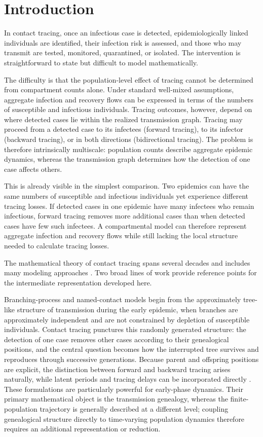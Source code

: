 \documentclass[review,12pt]{elsarticle}
\numberwithin{equation}{section}
\theoremstyle{remark}
\begin{document}
\section{Introduction}\label{sec1}

In contact tracing, once an infectious case is detected, epidemiologically linked individuals are identified, their infection risk is assessed, and those who may transmit are tested, monitored, quarantined, or isolated. The intervention is straightforward to state but difficult to model mathematically.

The difficulty is that the population-level effect of tracing cannot be determined from compartment counts alone. Under standard well-mixed assumptions, aggregate infection and recovery flows can be expressed in terms of the numbers of susceptible and infectious individuals. Tracing outcomes, however, depend on where detected cases lie within the realized transmission graph. Tracing may proceed from a detected case to its infectees (forward tracing), to its infector (backward tracing), or in both directions (bidirectional tracing). The problem is therefore intrinsically multiscale: population counts describe aggregate epidemic dynamics, whereas the transmission graph determines how the detection of one case affects others.

This is already visible in the simplest comparison. Two epidemics can have the same numbers of susceptible and infectious individuals yet experience different tracing losses. If detected cases in one epidemic have many infectees who remain infectious, forward tracing removes more additional cases than when detected cases have few such infectees. A compartmental model can therefore represent aggregate infection and recovery flows while still lacking the local structure needed to calculate tracing losses.

The mathematical theory of contact tracing spans several decades and includes many modeling approaches \cite{muller2021}. Two broad lines of work provide reference points for the intermediate representation developed here.

Branching-process and named-contact models begin from the approximately tree-like structure of transmission during the early epidemic, when branches are approximately independent and are not constrained by depletion of susceptible individuals. Contact tracing punctures this randomly generated structure: the detection of one case removes other cases according to their genealogical positions, and the central question becomes how the interrupted tree survives and reproduces through successive generations. Because parent and offspring positions are explicit, the distinction between forward and backward tracing arises naturally, while latent periods and tracing delays can be incorporated directly \cite{muller2000,klinkenberg2006,ball2011,ball2015,muller2016,okolie2020,muller2023}. These formulations are particularly powerful for early-phase dynamics. Their primary mathematical object is the transmission genealogy, whereas the finite-population trajectory is generally described at a different level; coupling genealogical structure directly to time-varying population dynamics therefore requires an additional representation or reduction.
\end{document}
